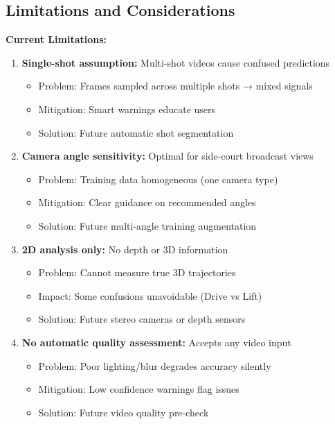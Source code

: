 \documentclass[11pt,a4paper]{article}
\begin{document}
\subsection{Limitations and Considerations}

\textbf{Current Limitations:}

\begin{enumerate}
\item \textbf{Single-shot assumption:} Multi-shot videos cause confused predictions
   \begin{itemize}
   \item Problem: Frames sampled across multiple shots → mixed signals
   \item Mitigation: Smart warnings educate users
   \item Solution: Future automatic shot segmentation
   \end{itemize}

\item \textbf{Camera angle sensitivity:} Optimal for side-court broadcast views
   \begin{itemize}
   \item Problem: Training data homogeneous (one camera type)
   \item Mitigation: Clear guidance on recommended angles
   \item Solution: Future multi-angle training augmentation
   \end{itemize}

\item \textbf{2D analysis only:} No depth or 3D information
   \begin{itemize}
   \item Problem: Cannot measure true 3D trajectories
   \item Impact: Some confusions unavoidable (Drive vs Lift)
   \item Solution: Future stereo cameras or depth sensors
   \end{itemize}

\item \textbf{No automatic quality assessment:} Accepts any video input
   \begin{itemize}
   \item Problem: Poor lighting/blur degrades accuracy silently
   \item Mitigation: Low confidence warnings flag issues
   \item Solution: Future video quality pre-check
   \end{itemize}
\end{enumerate}
\end{document}
